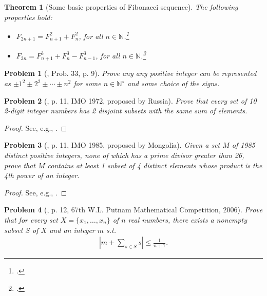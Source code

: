 \documentclass[oneside]{book}
\numberwithin{equation}{section}
\newtheorem{theorem}{Theorem}[section]
\newtheorem{problem}{Problem}[section]
\begin{document}
\begin{theorem}[Some basic properties of Fibonacci sequence]
	The following properties hold:
	\begin{itemize}
		\item $F_{2n+1} = F_{n+1}^2 + F_n^2$, for all $n\in\mathbb{N}$.\footnote{\cite[Prob. 27, p. 9]{Gelca_Andreescu2017}.}
		\item $F_{3n} = F_{n+1}^3 + F_n^3 - F_{n-1}^3$, for all $n\in\mathbb{N}$.\footnote{\cite[Prob. 28, p. 9]{Gelca_Andreescu2017}.}
	\end{itemize}
\end{theorem}

\begin{problem}[\cite{Gelca_Andreescu2017}, Prob. 33, p. 9]
	Prove any any positive integer can be represented as $\pm1^2\pm2^2\pm\cdots\pm n^2$ for some $n\in\mathbb{N}^\star$ and some choice of the signs.
\end{problem}

\begin{problem}[\cite{Gelca_Andreescu2017}, p. 11, IMO 1972, proposed by Russia]
	Prove that every set of 10 2-digit integer numbers has 2 disjoint subsets with the same sum of elements.
\end{problem}

\begin{proof}[Proof]
	See, e.g., \cite[p. 11]{Gelca_Andreescu2017}.
\end{proof}

\begin{problem}[\cite{Gelca_Andreescu2017}, p. 11, IMO 1985, proposed by Mongolia]
	Given a set $M$ of 1985 distinct positive integers, none of which has a prime divisor greater than 26, prove that $M$ contains at least 1 subset of 4 distinct elements whose product is the 4th power of an integer.
\end{problem}

\begin{proof}[Proof]
	See, e.g., \cite[pp. 11--12]{Gelca_Andreescu2017}.
\end{proof}

\begin{problem}[\cite{Gelca_Andreescu2017}, p. 12, 67th W.L. Putnam Mathematical Competition, 2006]
	Prove that for every set $X = \{x_1,\ldots,x_n\}$ of $n$ real numbers, there exists a nonempty subset $S$ of $X$ and an integer $m$ s.t.
	\begin{align*}
		\left|m + \sum_{s\in S} s\right|\le\frac{1}{n + 1}.
	\end{align*}
\end{problem}
\end{document}
